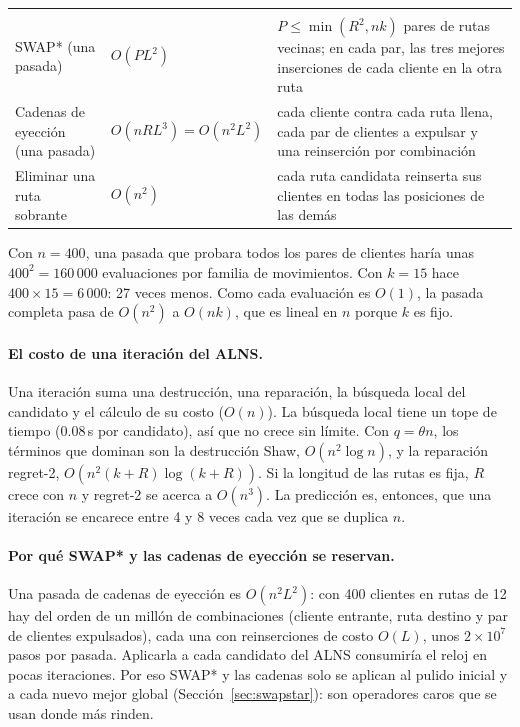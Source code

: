 \documentclass[11pt,a4paper]{article}
\begin{document}
\begin{table}[htbp]
\begin{tabular}{@{}>{\raggedright\arraybackslash}p{4.3cm}>{\raggedright\arraybackslash}p{4.4cm}>{\raggedright\arraybackslash}p{6.5cm}@{}}
\midrule
\multicolumn{3}{@{}l}{\emph{Intensificación}} \\
SWAP* (una pasada) & $O(PL^2)$ & $P\le\min(R^2,nk)$ pares de rutas vecinas; en cada par, las tres mejores inserciones de cada cliente en la otra ruta \\
Cadenas de eyección (una pasada) & $O(nRL^3)=O(n^2L^2)$ & cada cliente contra cada ruta llena, cada par de clientes a expulsar y una reinserción por combinación \\
Eliminar una ruta sobrante & $O(n^2)$ & cada ruta candidata reinserta sus clientes en todas las posiciones de las demás \\
\bottomrule
\end{tabular}
\end{table}

\begin{ejemplo}
Con $n=400$, una pasada que probara todos los pares de clientes haría unas $400^2=160\,000$
evaluaciones por familia de movimientos. Con $k=15$ hace $400\times15=6\,000$: 27 veces menos. Como
cada evaluación es $O(1)$, la pasada completa pasa de $O(n^2)$ a $O(nk)$, que es lineal en $n$
porque $k$ es fijo.
\end{ejemplo}

\paragraph{El costo de una iteración del ALNS.} Una iteración suma una destrucción, una reparación, la
búsqueda local del candidato y el cálculo de su costo ($O(n)$). La búsqueda local tiene un tope de
tiempo (0.08\,s por candidato), así que no crece sin límite. Con $q=\theta n$, los términos que
dominan son la destrucción Shaw, $O(n^2\log n)$, y la reparación regret-2,
$O(n^2(k+R)\log(k+R))$. Si la longitud de las rutas es fija, $R$ crece con $n$ y regret-2 se acerca a
$O(n^3)$. La predicción es, entonces, que una iteración se encarece entre 4 y 8 veces cada vez que
se duplica $n$.

\paragraph{Por qué SWAP* y las cadenas de eyección se reservan.} Una pasada de cadenas de eyección
es $O(n^2L^2)$: con 400 clientes en rutas de 12 hay del orden de un millón de combinaciones
(cliente entrante, ruta destino y par de clientes expulsados), cada una con reinserciones de costo
$O(L)$, unos $2\times10^{7}$ pasos por pasada. Aplicarla a cada candidato del ALNS consumiría el reloj en pocas
iteraciones. Por eso SWAP* y las cadenas solo se aplican al pulido inicial y a cada nuevo mejor
global (Sección~\ref{sec:swapstar}): son operadores caros que se usan donde más rinden.
\end{document}

